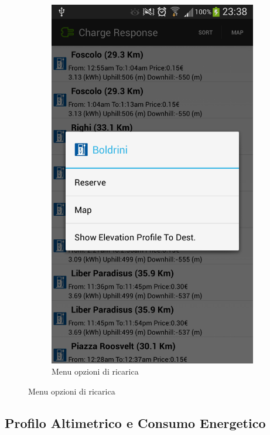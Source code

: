 \begin{figure}
\begin{subfigure}{0.45\textwidth}
		\includegraphics[width=\textwidth]{assets/mobile-app-charge-options-menu.png}
		\caption{Menu opzioni di ricarica}
		\label{fig:charge-options-menu}
    \end{subfigure}
\end{figure}

\subsection{Profilo Altimetrico e Consumo Energetico}\label{subsec:altimetry}

